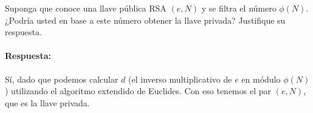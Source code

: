 
Suponga que conoce una llave pública RSA $(e,N)$ y se filtra el número $\phi(N)$. ¿Podría usted en base a este número obtener la llave privada? Justifique su respuesta.
\paragraph{Respuesta:} Sí, dado que podemos calcular $d$ (el inverso multiplicativo de $e$ en módulo $\phi(N)$) utilizando el algoritmo extendido de Euclides. Con eso tenemos el par $(e,N)$, que es la llave privada.

